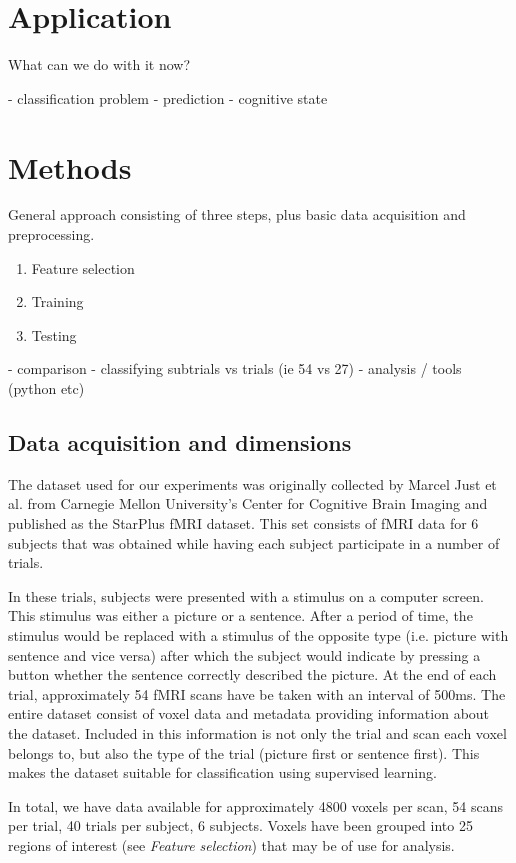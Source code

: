 \documentclass[preprint,journal,11pt]{vgtc}
\begin{document}
\section{Application}
\label{sec:application}


What can we do with it now?

- classification problem
- prediction
- cognitive state
\section{Methods}
\label{sec:methods}
General approach consisting of three steps, plus basic data acquisition and preprocessing.
\begin{enumerate}
  \item Feature selection
  \item Training
  \item Testing
\end{enumerate}



- comparison
- classifying subtrials vs trials (ie 54 vs 27)
- analysis / tools (python etc)

\subsection{Data acquisition and dimensions}
The dataset used for our experiments was originally collected by Marcel Just et al. from Carnegie Mellon University's Center for Cognitive Brain Imaging and published as the StarPlus fMRI dataset. This set consists of fMRI data for 6 subjects that was obtained while having each subject participate in a number of trials.

In these trials, subjects were presented with a stimulus on a computer screen. This stimulus was either a picture or a sentence. After a period of time, the stimulus would be replaced with a stimulus of the opposite type (i.e. picture with sentence and vice versa) after which the subject would indicate by pressing a button whether the sentence correctly described the picture. At the end of each trial, approximately 54 fMRI scans have be taken with an interval of 500ms.
The entire dataset consist of voxel data and metadata providing information about the dataset. Included in this information is not only the trial and scan each voxel belongs to, but also the type of the trial (picture first or sentence first). This makes the dataset suitable for classification using supervised learning.

In total, we have data available for approximately 4800 voxels per scan, 54 scans per trial, 40 trials per subject, 6 subjects. Voxels have been grouped into 25 regions of interest (see \textit{Feature selection}) that may be of use for analysis.
\end{document}
